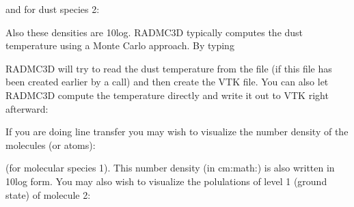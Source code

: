 \documentclass[letterpaper,10pt,english]{sphinxmanual}
\begin{document}
and for dust species 2:

\begin{sphinxVerbatim}[commandchars=\\\{\}]
  
\end{sphinxVerbatim}

Also these densities are 10\sphinxhyphen{}log. RADMC\sphinxhyphen{}3D typically computes the dust
temperature using a Monte Carlo approach. By typing

\begin{sphinxVerbatim}[commandchars=\\\{\}]
  
\end{sphinxVerbatim}

RADMC\sphinxhyphen{}3D will try to read the dust temperature from the file
 (if this file has been created
earlier by a  call) and then create
the VTK file. You can also let RADMC\sphinxhyphen{}3D compute the temperature
directly and write it out to VTK right afterward:

\begin{sphinxVerbatim}[commandchars=\\\{\}]
   
\end{sphinxVerbatim}

If you are doing line transfer you may wish to visualize the number density
of the molecules (or atoms):

\begin{sphinxVerbatim}[commandchars=\\\{\}]
  
\end{sphinxVerbatim}

(for molecular species 1). This number density (in cm:math:) is also
written in 10\sphinxhyphen{}log form.  You may also wish to visualize the polulations of
level 1 (ground state) of molecule 2:

\begin{sphinxVerbatim}[commandchars=\\\{\}]
   
\end{sphinxVerbatim}
\end{document}
